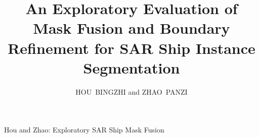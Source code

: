 \documentclass[journal]{IEEEtran}
\begin{document}
\title{An Exploratory Evaluation of Mask Fusion and Boundary Refinement for SAR Ship Instance Segmentation}

\author{HOU~BINGZHI and ZHAO~PANZI}

%
{Hou and Zhao: Exploratory SAR Ship Mask Fusion}

\maketitle










\end{document}
